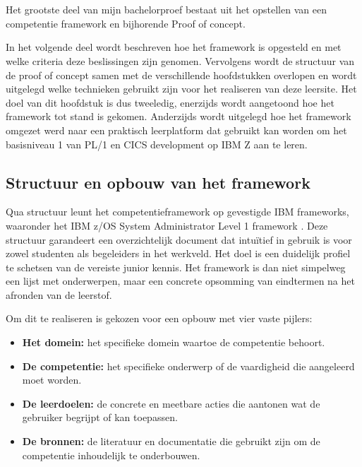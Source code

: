 
\chapter{}%
\label{ch:frameworkpoc}


Het grootste deel van mijn bachelorproef bestaat uit het opstellen van een competentie framework en bijhorende Proof of concept.

In het volgende deel wordt beschreven hoe het framework is opgesteld en met welke criteria deze beslissingen zijn genomen.
Vervolgens wordt de structuur van de proof of concept samen met de verschillende hoofdstukken overlopen en wordt uitgelegd welke technieken gebruikt zijn voor het realiseren van deze leersite. 
Het doel van dit hoofdstuk is dus tweeledig, enerzijds wordt aangetoond hoe het framework tot stand is gekomen.
Anderzijds wordt uitgelegd hoe het framework omgezet werd naar een praktisch leerplatform dat gebruikt kan worden om het basisniveau 1 van PL/1 en CICS development op IBM Z aan te leren.

\section{Structuur en opbouw van het framework}%
\label{sec:opbouw-van-het-framework}

Qua structuur leunt het competentieframework op gevestigde IBM frameworks, waaronder het IBM z/OS System Administrator Level 1 framework \autocite{ibm_z_sysadmin_level1}. 
Deze structuur garandeert een overzichtelijk document dat intuïtief in gebruik is voor zowel studenten als begeleiders in het werkveld.
Het doel is een duidelijk profiel te schetsen van de vereiste junior kennis. 
Het framework is dan niet simpelweg een lijst met onderwerpen, maar een concrete opsomming van eindtermen na het afronden van de leerstof.

Om dit te realiseren is gekozen voor een opbouw met vier vaste pijlers:

\begin{itemize}
    \item \textbf{Het domein:} het specifieke domein waartoe de competentie behoort.
    \item \textbf{De competentie:} het specifieke onderwerp of de vaardigheid die aangeleerd moet worden.
    \item \textbf{De leerdoelen:} de concrete en meetbare acties die aantonen wat de gebruiker begrijpt of kan toepassen.
    \item \textbf{De bronnen:} de literatuur en documentatie die gebruikt zijn om de competentie inhoudelijk te onderbouwen.
\end{itemize}


